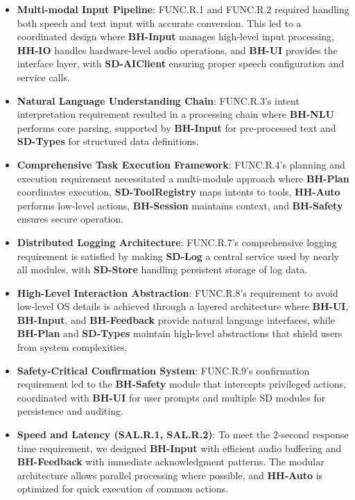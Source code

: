 \documentclass[12pt, titlepage]{article}
\begin{document}
\begin{itemize}
    \item \textbf{Multi-modal Input Pipeline}: FUNC.R.1 and FUNC.R.2 required
    handling both speech and text input with accurate conversion. This led to a
    coordinated design where \textbf{BH-Input} manages high-level input
    processing, \textbf{HH-IO} handles hardware-level audio operations, and
    \textbf{BH-UI} provides the interface layer, with \textbf{SD-AIClient}
    ensuring proper speech configuration and service calls.

    \item \textbf{Natural Language Understanding Chain}: FUNC.R.3's intent
    interpretation requirement resulted in a processing chain where
    \textbf{BH-NLU} performs core parsing, supported by \textbf{BH-Input} for
    pre-processed text and \textbf{SD-Types} for structured data definitions.

    \item \textbf{Comprehensive Task Execution Framework}: FUNC.R.4's planning
    and execution requirement necessitated a multi-module approach where
    \textbf{BH-Plan} coordinates execution, \textbf{SD-ToolRegistry} maps intents
    to tools, \textbf{HH-Auto} performs low-level actions, \textbf{BH-Session}
    maintains context, and \textbf{BH-Safety} ensures secure operation.

    \item \textbf{Distributed Logging Architecture}: FUNC.R.7's comprehensive
    logging requirement is satisfied by making \textbf{SD-Log} a central service
    used by nearly all modules, with \textbf{SD-Store} handling persistent
    storage of log data.

    \item \textbf{High-Level Interaction Abstraction}: FUNC.R.8's requirement to
    avoid low-level OS details is achieved through a layered architecture where
    \textbf{BH-UI}, \textbf{BH-Input}, and \textbf{BH-Feedback} provide natural
    language interfaces, while \textbf{BH-Plan} and \textbf{SD-Types} maintain
    high-level abstractions that shield users from system complexities.

    \item \textbf{Safety-Critical Confirmation System}: FUNC.R.9's confirmation
    requirement led to the \textbf{BH-Safety} module that intercepts privileged
    actions, coordinated with \textbf{BH-UI} for user prompts and multiple SD
    modules for persistence and auditing.

    \item \textbf{Speed and Latency (SAL.R.1, SAL.R.2)}: To meet the 2-second
    response time requirement, we designed \textbf{BH-Input} with efficient
    audio buffering and \textbf{BH-Feedback} with immediate acknowledgment
    patterns. The modular architecture allows parallel processing where
    possible, and \textbf{HH-Auto} is optimized for quick execution of common
    actions.


\end{itemize}
\end{document}
